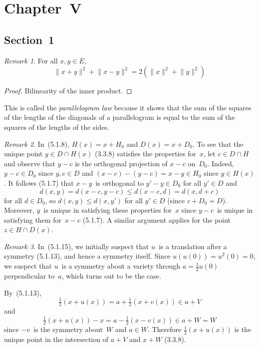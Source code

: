 \documentclass[letterpaper,12pt]{article}
\newcommand{\sect}{\cap}
\newcommand{\norm}[1]{\lVert{#1}\rVert}
\theoremstyle{definition}
\theoremstyle{remark}
\newtheorem*{rmk}{Remark}
\begin{document}
\section*{Chapter~V}
\subsection*{Section~1}
\begin{rmk}
For all \(x,y\in E\),
\[\norm{x+y}^2+\norm{x-y}^2=2\left(\norm{x}^2+\norm{y}^2\right)\]
\end{rmk}
\begin{proof}
Bilinearity of the inner product.
\end{proof}
\noindent This is called the \emph{parallelogram law} because it shows that the sum of the squares of the lengths of the diagonals of a parallelogram is equal to the sum of the squares of the lengths of the sides.

\begin{rmk}
In~(5.1.8), \(H(x)=x+H_0\) and \(D(x)=x+D_0\). To see that the unique point \(y\in D\sect H(x)\) (3.3.8) satisfies the properties for~\(x\), let \(c\in D\sect H\) and observe that \(y-c\) is the orthogonal projection of \(x-c\) on~\(D_0\). Indeed, \(y-c\in D_0\) since \(y,c\in D\) and \((x-c)-(y-c)=x-y\in H_0\) since \(y\in H(x)\). It follows (5.1.7) that \(x-y\)~is orthogonal to \(y'-y\in D_0\) for all \(y'\in D\) and
\[d(x,y)=d(x-c,y-c)\le d(x-c,d)=d(x,d+c)\]
for all \(d\in D_0\), so \(d(x,y)\le d(x,y')\) for all \(y'\in D\) (since \(c+D_0=D\)). Moreover, \(y\)~is unique in satisfying these properties for~\(x\) since \(y-c\)~is unique in satisfying them for~\(x-c\) (5.1.7). A similar argument applies for the point \(z\in H\sect D(x)\).
\end{rmk}

\begin{rmk}
In~(5.1.15), we initially suspect that \(u\)~is a translation after a symmetry (5.1.13), and hence a symmetry itself. Since \(u(u(0))=u^2(0)=0\), we suspect that \(u\)~is a symmetry about a variety through \(a=\tfrac{1}{2}u(0)\) perpendicular to~\(a\), which turns out to be the case.

By~(5.1.13),
\[\tfrac{1}{2}(x+u(x))=a+\tfrac{1}{2}(x+v(x))\in a+V\]
and
\[\tfrac{1}{2}(x+u(x))-x=a-\tfrac{1}{2}(x-v(x))\in a+W=W\]
since \(-v\)~is the symmetry about~\(W\) and \(a\in W\). Therefore \(\tfrac{1}{2}(x+u(x))\) is the unique point in the intersection of \(a+V\) and \(x+W\) (3.3.8).
\end{rmk}
\end{document}
